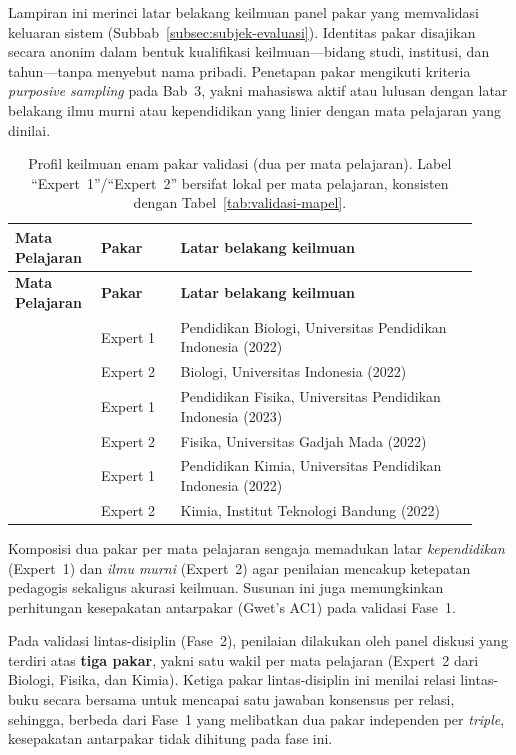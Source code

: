 \documentclass[../../thesis]{subfiles}
\begin{document}
\ifSubfilesClassLoaded{}{\appendix\setcounter{chapter}{1}}

\label{lamp:profil-pakar}

Lampiran ini merinci latar belakang keilmuan panel pakar yang memvalidasi
keluaran sistem (Subbab~\ref{subsec:subjek-evaluasi}). Identitas pakar
disajikan secara anonim dalam bentuk kualifikasi keilmuan---bidang studi,
institusi, dan tahun---tanpa menyebut nama pribadi. Penetapan pakar mengikuti
kriteria \textit{purposive sampling} pada Bab~3, yakni mahasiswa aktif atau
lulusan dengan latar belakang ilmu murni atau kependidikan yang linier dengan
mata pelajaran yang dinilai.

\begin{longtable}{@{}
  >{\raggedright\arraybackslash}p{0.16\linewidth}
  >{\raggedright\arraybackslash}p{0.16\linewidth}
  >{\raggedright\arraybackslash}p{0.60\linewidth}@{}}
\caption{Profil keilmuan enam pakar validasi (dua per mata pelajaran). Label
  ``Expert~1''/``Expert~2'' bersifat lokal per mata pelajaran, konsisten dengan
  Tabel~\ref{tab:validasi-mapel}.}
\label{tab:profil-pakar}\\
\toprule
\textbf{Mata Pelajaran} & \textbf{Pakar} & \textbf{Latar belakang keilmuan} \\
\midrule
\endfirsthead
\toprule
\textbf{Mata Pelajaran} & \textbf{Pakar} & \textbf{Latar belakang keilmuan} \\
\midrule
\endhead
\bottomrule
\endlastfoot
\multirow{2}{*}{Biologi}
  & Expert 1 & Pendidikan Biologi, Universitas Pendidikan Indonesia (2022) \\
  & Expert 2 & Biologi, Universitas Indonesia (2022) \\
\midrule
\multirow{2}{*}{Fisika}
  & Expert 1 & Pendidikan Fisika, Universitas Pendidikan Indonesia (2023) \\
  & Expert 2 & Fisika, Universitas Gadjah Mada (2022) \\
\midrule
\multirow{2}{*}{Kimia}
  & Expert 1 & Pendidikan Kimia, Universitas Pendidikan Indonesia (2022) \\
  & Expert 2 & Kimia, Institut Teknologi Bandung (2022) \\
\end{longtable}

Komposisi dua pakar per mata pelajaran sengaja memadukan latar \emph{kependidikan}
(Expert~1) dan \emph{ilmu murni} (Expert~2) agar penilaian mencakup ketepatan
pedagogis sekaligus akurasi keilmuan. Susunan ini juga memungkinkan perhitungan
kesepakatan antarpakar (Gwet's AC1) pada validasi Fase~1.

Pada validasi lintas-disiplin (Fase~2), penilaian dilakukan oleh panel diskusi
yang terdiri atas \textbf{tiga pakar}, yakni satu wakil per mata pelajaran
(Expert~2 dari Biologi, Fisika, dan Kimia). Ketiga pakar lintas-disiplin ini
menilai relasi lintas-buku secara bersama untuk mencapai satu jawaban konsensus
per relasi, sehingga, berbeda dari Fase~1 yang melibatkan dua pakar independen
per \textit{triple}, kesepakatan antarpakar tidak dihitung pada fase ini.
\end{document}
